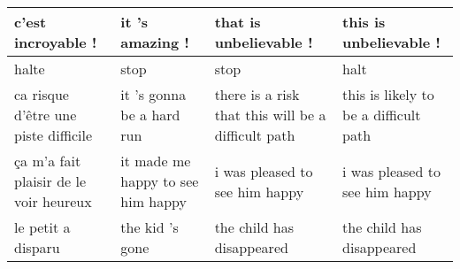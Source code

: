 \documentclass[11pt,a4paper]{article}
\begin{document}
\begin{table*}[]
\begin{tabular}{|p{3.5cm}|p{3.5cm}|p{3.5cm}|p{3.5cm}|}
c'est incroyable !                                                                                                                                & it 's amazing !                                                                                                              & that is unbelievable !                                                                                                                              & this is unbelievable !                                                                                                                            \\ \hline
halte                                                                                                                                             & stop                                                                                                                         & stop                                                                                                                                                & halt                                                                                                                                              \\ \hline
ca risque d'{\^e}tre une piste difficile                                                                                                            & it 's gonna be a hard run                                                                                                  & there is a risk that this will be a difficult path                                                                                                & this is likely to be a difficult path                                                                                                           \\ \hline
{\c c}a m'a fait plaisir de le voir heureux                                                                                                          & it made me happy to see him happy                                                                                          & i was pleased to see him happy                                                                                                                   & i was pleased to see him happy                                                                                                                  \\ \hline
le petit a disparu & the kid 's gone & the child has disappeared & the child has disappeared \\ \hline

\end{tabular}
\end{table*}
\end{document}
